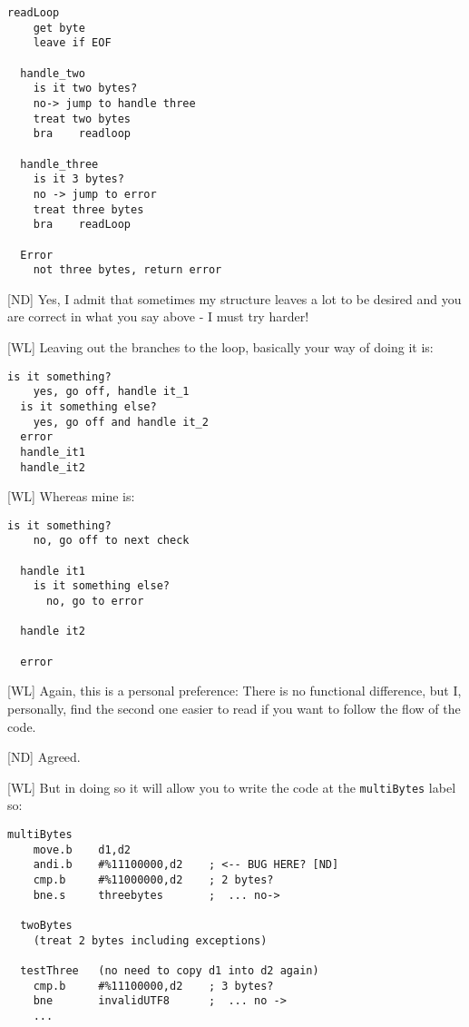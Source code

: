 \begin{lstlisting}[numbers=none]	
  readLoop
    get byte
    leave if EOF

  handle_two
    is it two bytes?
    no-> jump to handle three
    treat two bytes
    bra    readloop

  handle_three
    is it 3 bytes?
    no -> jump to error
    treat three bytes
    bra    readLoop

  Error   
    not three bytes, return error
\end{lstlisting}

[ND] Yes, I admit that sometimes my structure leaves a lot to be desired and you are correct in what you say above - I must try harder!
	
	
[WL] Leaving out the branches to the loop, basically your way of doing it is:
	
\begin{lstlisting}[numbers=none]	
  is it something?
    yes, go off, handle it_1
  is it something else?
    yes, go off and handle it_2
  error
  handle_it1
  handle_it2
\end{lstlisting}
	
[WL] Whereas mine is:
	
\begin{lstlisting}[numbers=none]	
  is it something?
    no, go off to next check

  handle it1
    is it something else?
      no, go to error

  handle it2

  error
\end{lstlisting}
	
[WL] Again, this is a personal preference: There is no functional difference, but I, personally, find the second one easier to read if you want to follow the flow of the code.

[ND] Agreed.
	
[WL] But in doing so it will allow you to write the code at the \texttt{multiBytes} label so:
	
\begin{lstlisting}[numbers=none]	
  multiBytes
    move.b    d1,d2
    andi.b    #%11100000,d2    ; <-- BUG HERE? [ND]
    cmp.b     #%11000000,d2    ; 2 bytes?
    bne.s     threebytes       ;  ... no->

  twoBytes
    (treat 2 bytes including exceptions)

  testThree   (no need to copy d1 into d2 again)
    cmp.b     #%11100000,d2    ; 3 bytes?
    bne       invalidUTF8      ;  ... no ->
    ...
\end{lstlisting}
	

